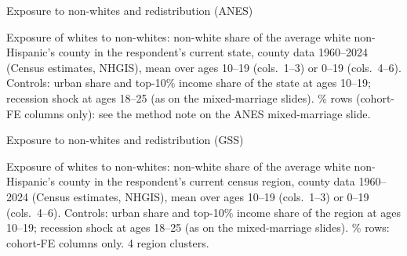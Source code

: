 \documentclass[aspectratio=169]{beamer}
\begin{document}
\begin{frame}{Exposure to non-whites and redistribution (ANES)}

\begin{table}
    \centering
    \scalebox{0.85}{\parbox{\linewidth}{\centering\tiny\setlength{\tabcolsep}{4pt}\renewcommand{\arraystretch}{0.72}
    }}
\end{table}
\vspace{-0.4em}
{\tiny Exposure of whites to non-whites: non-white share of the average white non-Hispanic's county in the respondent's current state, county data 1960--2024 (Census estimates, NHGIS), mean over ages 10--19 (cols.\ 1--3) or 0--19 (cols.\ 4--6). Controls: urban share and top-10\% income share of the state at ages 10--19; recession shock at ages 18--25 (as on the mixed-marriage slides). \% rows (cohort-FE columns only): see the method note on the ANES mixed-marriage slide.\par}

\end{frame}


\begin{frame}{Exposure to non-whites and redistribution (GSS)}

\begin{table}
    \centering
    \scalebox{0.85}{\parbox{\linewidth}{\centering\tiny\setlength{\tabcolsep}{4pt}\renewcommand{\arraystretch}{0.72}
    }}
\end{table}
\vspace{-0.4em}
{\tiny Exposure of whites to non-whites: non-white share of the average white non-Hispanic's county in the respondent's current census region, county data 1960--2024 (Census estimates, NHGIS), mean over ages 10--19 (cols.\ 1--3) or 0--19 (cols.\ 4--6). Controls: urban share and top-10\% income share of the region at ages 10--19; recession shock at ages 18--25 (as on the mixed-marriage slides). \% rows: cohort-FE columns only. 4 region clusters.\par}

\end{frame}
\end{document}
